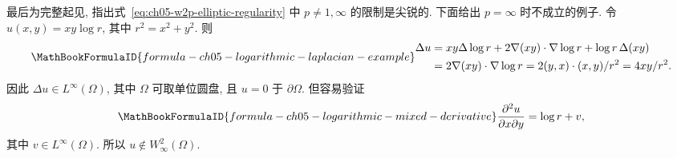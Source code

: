 \begin{Example}
\label{ex:ch05-w2-infinity-failure}
最后为完整起见, 指出式~\eqref{eq:ch05-w2p-elliptic-regularity} 中 $p\ne1,\infty$ 的限制是尖锐的. 下面给出 $p=\infty$ 时不成立的例子. 令 $u(x,y)=xy\log r$, 其中 $r^2=x^2+y^2$. 则
\[
\MathBookFormulaID{formula-ch05-logarithmic-laplacian-example}
\begin{aligned}
\Delta u
&=xy\Delta\log r+2\nabla(xy)\cdot\nabla\log r+\log r\,\Delta(xy)\\
&=2\nabla(xy)\cdot\nabla\log r
=2(y,x)\cdot(x,y)/r^2
=4xy/r^2.
\end{aligned}
\]
因此 $\Delta u\in L^\infty(\Omega)$, 其中 $\Omega$ 可取单位圆盘, 且 $u=0$ 于 $\partial\Omega$. 但容易验证
\[
\MathBookFormulaID{formula-ch05-logarithmic-mixed-derivative}
\frac{\partial^2u}{\partial x\partial y}=\log r+v,
\]
其中 $v\in L^\infty(\Omega)$. 所以 $u\notin W_\infty^2(\Omega)$.
\end{Example}
